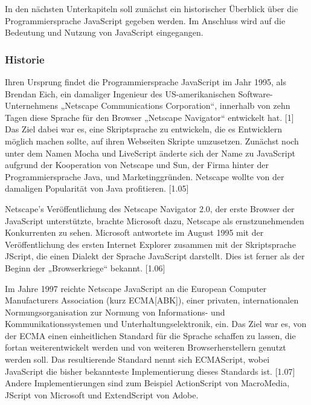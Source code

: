 In den nächsten Unterkapiteln soll zunächst ein historischer Überblick über die Programmiersprache JavaScript gegeben werden. Im Anschluss wird auf die Bedeutung und Nutzung von JavaScript eingegangen. 
\newline

\subsubsection{Historie}
Ihren Ursprung findet die Programmiersprache JavaScript im Jahr 1995, als Brendan Eich, ein damaliger Ingenieur des US-amerikanischen Software-Unternehmens „Netscape Communications Corporation“, innerhalb von zehn Tagen diese Sprache für den Browser „Netscape Navigator“ entwickelt hat. [1] Das Ziel dabei war es, eine Skriptsprache zu entwickeln, die es Entwicklern möglich machen sollte, auf ihren Webseiten Skripte umzusetzen. Zunächst noch unter dem Namen Mocha und LiveScript änderte sich der Name zu JavaScript aufgrund der Kooperation von Netscape und Sun, der Firma hinter der Programmiersprache Java, und Marketinggründen. Netscape wollte von der damaligen Popularität von Java profitieren. [1.05] 
\newline

\noindent
Netscape’s Veröffentlichung des Netscape Navigator 2.0, der erste Browser der JavaScript unterstützte, brachte Microsoft dazu, Netscape als ernstzunehmenden Konkurrenten zu sehen. 
Microsoft antwortete im August 1995 mit der Veröffentlichung des ersten Internet Explorer zusammen mit der Skriptsprache JScript, die einen Dialekt der Sprache JavaScript darstellt. Dies ist ferner als der Beginn der „Browserkriege“ bekannt. [1.06] \newline

\noindent
Im Jahre 1997 reichte Netscape JavaScript an die European Computer Manufacturers Association (kurz ECMA[ABK]), einer privaten, internationalen Normungsorganisation zur Normung von Informations- und Kommunikationssystemen und Unterhaltungselektronik, ein. Das Ziel war es, von der ECMA einen einheitlichen Standard für die Sprache schaffen zu lassen, die fortan weiterentwickelt werden und von weiteren Browserherstellern genutzt werden soll. Das resultierende Standard nennt sich ECMAScript, wobei JavaScript die bisher bekannteste Implementierung dieses Standards ist. [1.07] Andere Implementierungen sind zum Beispiel ActionScript von Macro\-Media, JScript von Microsoft und ExtendScript von Adobe.
\newline
 
